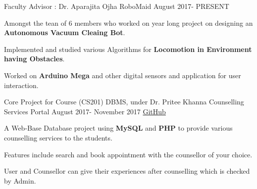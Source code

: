 \begin{cventries}
  \cventry
    {\small Faculty Advisor : Dr. Aparajita Ojha}
    {\small RoboMaid}
    {\small August 2017- PRESENT}
    {}
    {
      \begin{cvitems}\small
        \item {Amongst the tean of 6 members who worked on year long project on designing an \textbf{Autonomous Vacuum Cleaing Bot}.}
        \item {Implemented and studied various Algorithms for \textbf{Locomotion in Environment having Obstacles}.}
        \item {Worked on \textbf{Arduino Mega} and other digital sensors and application for user interaction.}
      \end{cvitems}
    }
\end{cventries}
\begin{cventries}
  \cventry
    {\small Core Project for Course (CS201) DBMS, under Dr. Pritee Khanna}
    {\small Counselling Services Portal}
    {\small August 2017- November 2017}
    {\small \href{https://goo.gl/ftZFww}{GitHub}}
    {
      \begin{cvitems}\small
        \item {A Web-Base Database project using \textbf{MySQL} and \textbf{PHP} to provide various counselling services to the students.}
        \item {Features include search and book appointment with the counsellor of your choice.}
        \item {User and Counsellor can give their experiences after counselling which is checked by Admin.}
      \end{cvitems}
    }
\end{cventries}
